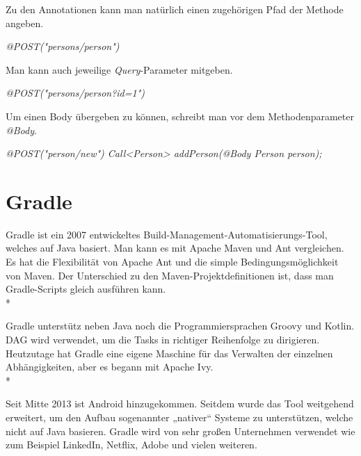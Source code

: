 Zu den Annotationen kann man natürlich einen zugehörigen Pfad der Methode angeben.

\textit{@POST("persons/person")}

Man kann auch jeweilige \textit{Query}-Parameter mitgeben.

\textit{@POST("persons/person?id=1")}

Um einen Body übergeben zu können, schreibt man vor dem Methodenparameter \textit{@Body}.

\textit{
@POST("person/new")
Call<Person> addPerson(@Body Person person);
}



\section{Gradle}
\cite{Gradle1}
\cite{Gradle2}
\author{Bozidar Spasenovic}
Gradle ist ein 2007 entwickeltes Build-Management-Automatisierungs-Tool, welches auf Java basiert.
Man kann es mit Apache Maven und Ant vergleichen.
Es hat die Flexibilität von Apache Ant und die simple Bedingungsmöglichkeit von Maven.
Der Unterschied zu den  Maven-Projektdefinitionen ist, dass man Gradle-Scripts gleich ausführen kann.
 \\*
    
Gradle unterstütz neben Java noch die Programmiersprachen Groovy und Kotlin.
DAG wird verwendet, um die Tasks in richtiger Reihenfolge zu dirigieren.
Heutzutage hat Gradle eine eigene Maschine für das Verwalten der einzelnen Abhängigkeiten, aber es begann mit Apache Ivy.
\\*


Seit Mitte 2013 ist Android hinzugekommen. Seitdem wurde das Tool weitgehend erweitert, um den Aufbau sogenannter „nativer“ Systeme zu unterstützen, welche nicht auf Java basieren.
Gradle wird von sehr großen Unternehmen verwendet wie zum Beispiel LinkedIn, Netflix, Adobe und vielen weiteren.

